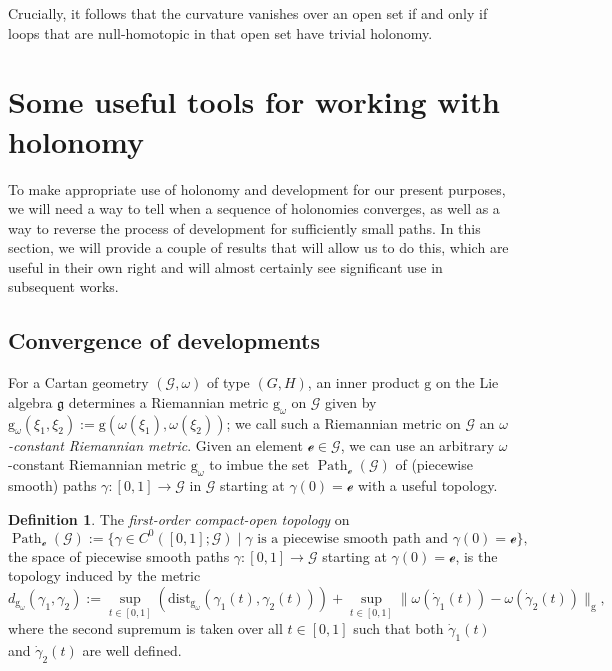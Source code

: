 \documentclass[10pt,a4paper]{amsart}
\numberwithin{equation}{section}
\theoremstyle{definition}
\newtheorem{Definition}[Theorem]{Definition}
\DeclareMathOperator{\Path}{Path}
\begin{document}
Crucially, it follows that the curvature vanishes over an open set if and only if loops that are null-homotopic in that open set have trivial holonomy.

\section{Some useful tools for working with holonomy}\label{devtools}
To make appropriate use of holonomy and development for our present purposes, we will need a way to tell when a sequence of holonomies converges, as well as a way to reverse the process of development for sufficiently small paths. In this section, we will provide a couple of results that will allow us to do this, which are useful in their own right and will almost certainly see significant use in subsequent works.

\subsection{Convergence of developments}
For a Cartan geometry $(\mathscr{G},\omega)$ of type $(G,H)$, an inner product $\mathrm{g}$ on the Lie algebra $\mathfrak{g}$ determines a Riemannian metric $\mathrm{g}_\omega$ on $\mathscr{G}$ given by $\mathrm{g}_\omega(\xi_1,\xi_2):=\mathrm{g}(\omega(\xi_1),\omega(\xi_2))$; we call such a Riemannian metric on $\mathscr{G}$ an \emph{$\omega$-constant Riemannian metric}. Given an element $\mathscr{e}\in\mathscr{G}$, we can use an arbitrary $\omega$-constant Riemannian metric $\mathrm{g}_\omega$ to imbue the set $\Path_\mathscr{e}(\mathscr{G})$ of (piecewise smooth) paths $\gamma \colon [0,1]\to\mathscr{G}$ in $\mathscr{G}$ starting at $\gamma(0)=\mathscr{e}$ with a useful topology.

\begin{Definition}The \emph{first-order compact-open topology} on \[\Path_\mathscr{e}(\mathscr{G}):=\bigl\{\gamma\in C^0([0,1];\mathscr{G})\mid  \gamma\text{ is a piecewise smooth path and }\gamma(0)=\mathscr{e} \bigr\},\] the space of piecewise smooth paths $\gamma \colon [0,1]\to\mathscr{G}$ starting at $\gamma(0)=\mathscr{e}$, is the topology induced by the metric \[d_{\mathrm{g}_\omega}(\gamma_1,\gamma_2):=\sup_{t\in[0,1]} (\mathrm{dist}_{\mathrm{g}_\omega}(\gamma_1(t), \gamma_2(t)) )+\sup_{t\in[0,1]}\|\omega(\dot{\gamma}_1(t))-\omega(\dot{\gamma}_2(t))\|_\mathrm{g},\] where the second supremum is taken over all $t\in[0,1]$ such that both $\dot{\gamma}_1(t)$ and $\dot{\gamma}_2(t)$ are well defined.
\end{Definition}
\end{document}
